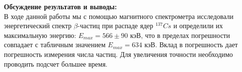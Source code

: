 \documentclass[a4paper, 12pt]{article}%
\begin{document}
\begin{enumerate}
		\textbf{Обсуждение результатов и выводы: }\\  
		
		В ходе данной работы мы с помощью магнитного спектрометра исследовали энергетический спектр $\beta$-частиц при распаде ядер ${}^{137}Cs$ и определили их максимальную энергию: $E_{max} = 566 \pm 90$ кэВ, что в пределах погрешности совпадает с табличным значением $E_{max} = 634$ кэВ. Вклад в погрешность дает погрешность измерения числа частиц. Для увеличения точности необходимо проводить подсчет большее время.
		
		
		
		
		
		
		
		
		
		
		
		
		
		
		
		
		
	\end{enumerate}
	
	
	
	
	
	
	
	
	
	
	
	
	
	
	
	
	
	
	
	
	
	
	
	
	
	
	
	
	
	
	
	
	
	
	
	
	
	
\end{document}
